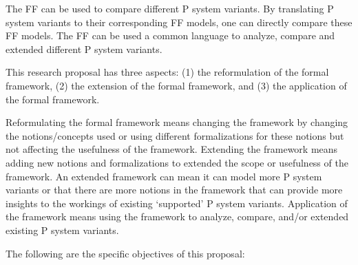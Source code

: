 \documentclass{article}
\begin{document}
The FF can be used to compare different P system variants. By translating P system variants to their 
corresponding FF models, one can directly compare these FF models. The FF can be used a common       
language to analyze, compare and extended different P system variants. 

This research proposal has three aspects: (1) the reformulation of the formal framework, (2) the      
extension of the formal framework, and (3) the application of the formal framework. 

                                                                                                     
Reformulating the formal framework means changing the framework by changing the notions/concepts     
used or using different formalizations for these notions but not affecting the usefulness of the     
framework. Extending the framework means adding new notions and formalizations to extended the       
scope or usefulness of the framework. An extended framework can mean it can model more P system      
variants or that there are more notions in the framework that can provide more insights to the       
workings of existing `supported' P system variants. Application of the framework means using the     
framework to analyze, compare, and/or extended existing P system variants. 

The following are the specific objectives of this proposal:                                          
                                                                                                     
\end{document}
